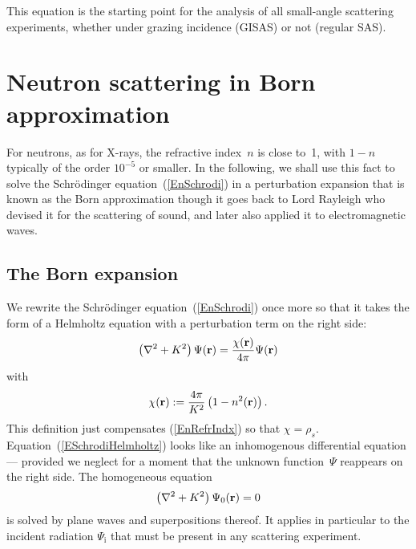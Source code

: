 This equation is the starting point for the analysis of all
small-angle scattering experiments,
whether under grazing incidence (GISAS) or not (regular SAS).


\section{Neutron scattering in Born approximation}

For neutrons, as for X-rays, the refractive index~$n$ is close to~1,
with $1-n$ typically of the order $10^{-5}$ or smaller.
In the following,
we shall use this fact to solve the Schrödinger equation~(\ref{EnSchrodi})
in a perturbation expansion
that is known as the Born approximation
though it goes back to Lord Rayleigh
who devised it for the scattering of sound,
and later also applied it to electromagnetic waves.

\subsection{The Born expansion}\label{SBorn}


We rewrite the Schrödinger equation~(\ref{EnSchrodi})
once more so that it takes the form of a Helmholtz equation
with a perturbation term on the right side:
\begin{equation}\label{ESchrodiHelmholtz}
  \left(\mathbf{\nabla}^2+K^2\right)\Psi(\mathbf{r})
  = \frac{\chi(\mathbf{r})}{4\pi}\Psi(\mathbf{r})
\end{equation}
with
\begin{equation}\label{EChiDef}
  \chi(\mathbf{r}) := \frac{4\pi}{K^2}\left(1-n^2(\mathbf{r})\right).
\end{equation}
This definition just compensates (\ref{EnRefrIndx}) so that $\chi=\rho_s$.
Equation~(\ref{ESchrodiHelmholtz}) looks
like an inhomogenous differential equation ---
provided we neglect for a moment that the unknown function~$\Psi$
reappears on the right side.
The homogeneous equation
\begin{equation}\label{EHelmholtzHomog}
  \left(\mathbf{\nabla}^2+K^2\right)\Psi_0(\mathbf{r}) = 0
\end{equation}
is solved by plane waves and superpositions thereof.
It applies in particular to the incident radiation
$\Psi_\text{i}$ that must be present in any scattering experiment.

